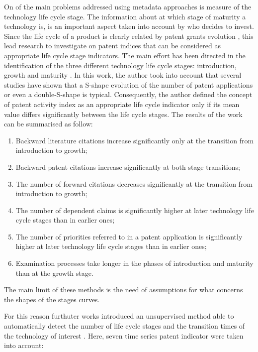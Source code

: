 \documentclass[]{book}
\providecommand{\tightlist}{%
  \setlength{\itemsep}{0pt}\setlength{\parskip}{0pt}}
\begin{document}
On of the main problems addressed using metadata approaches is measure
of the technology life cycle stage. The information about at which stage
of maturity a technology is, is an important aspect taken into account
by who decides to invest. Since the life cycle of a product is clearly
related by patent grants evolution \citep{andersen1999hunt}, this lead
research to investigate on patent indices that can be considered as
appropriate life cycle stage indicators. The main effort has been
directed in the identification of the three different technology life
cycle stages: introduction, growth and maturity \citep{haupt2007patent}.
In this work, the author took into account that several studies have
shown that a S-shape evolution of the number of patent applications or
even a double-S-shape is typical. Consequently, the author defined the
concept of patent activity index as an appropriate life cycle indicator
only if its mean value differs significantly between the life cycle
stages. The results of the work can be summarised as follow:

\begin{enumerate}
\def\labelenumi{\arabic{enumi}.}
\tightlist
\item
  Backward literature citations increase significantly only at the
  transition from introduction to growth;
\item
  Backward patent citations increase significantly at both stage
  transitions;
\item
  The number of forward citations decreases significantly at the
  transition from introduction to growth;
\item
  The number of dependent claims is significantly higher at later
  technology life cycle stages than in earlier ones;
\item
  The number of priorities referred to in a patent application is
  significantly higher at later technology life cycle stages than in
  earlier ones;
\item
  Examination processes take longer in the phases of introduction and
  maturity than at the growth stage.
\end{enumerate}

The main limit of these methods is the need of assumptions for what
concerns the shapes of the stages curves.

For this reason furthuter works introduced an unsupervised method able
to automatically detect the number of life cycle stages and the
transition times of the technology of interest
\citep{lee2016stochastic}. Here, seven time series patent indicator were
taken into account:
\end{document}
